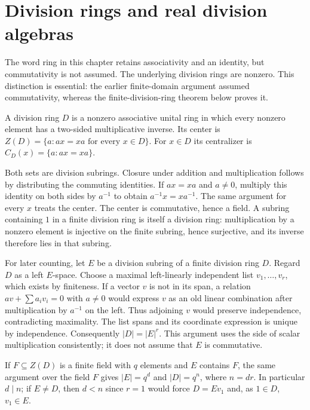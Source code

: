 \chapter{Division rings and real division algebras}
\label{chap:M07.23}
The word ring in this chapter retains associativity and an identity, but
commutativity is not assumed. The underlying division rings are nonzero.
This distinction is essential: the earlier finite-domain argument assumed
commutativity, whereas the finite-division-ring theorem below proves it.

\begin{definition}
A division ring $D$ is a nonzero associative unital ring in which every
nonzero element has a two-sided multiplicative inverse. Its center is
$Z(D)=\{a:ax=xa\text{ for every }x\in D\}$. For $x\in D$ its
centralizer is $C_D(x)=\{a:ax=xa\}$.
\end{definition}
Both sets are division subrings. Closure under addition and multiplication
follows by distributing the commuting identities. If $ax=xa$ and $a\ne0$,
multiply this identity on both sides by $a^{-1}$ to obtain
$a^{-1}x=xa^{-1}$. The same argument for every $x$ treats the center.
The center is commutative, hence a field. A subring containing $1$ in a
finite division ring is itself a division ring: multiplication by a
nonzero element is injective on the finite subring, hence surjective, and
its inverse therefore lies in that subring.

For later counting, let $E$ be a division subring of a finite division
ring $D$. Regard $D$ as a left $E$-space. Choose a maximal left-linearly
independent list $v_1,\ldots,v_r$, which exists by finiteness. If a vector
$v$ is not in its span, a relation
$a v+\sum a_i v_i=0$ with $a\ne0$ would express $v$ as an old linear
combination after multiplication by $a^{-1}$ on the left. Thus adjoining
$v$ would preserve independence, contradicting maximality. The list
spans and its coordinate expression is unique by independence. Consequently
$|D|=|E|^r$. This argument uses the side of scalar multiplication consistently;
it does not assume that $E$ is commutative.

If $F\subseteq Z(D)$ is a finite field with $q$ elements and $E$ contains
$F$, the same argument over the field $F$ gives $|E|=q^d$ and
$|D|=q^n$, where $n=dr$. In particular $d\mid n$; if $E\ne D$, then
$d<n$ since $r=1$ would force $D=Ev_1$ and, as $1\in D$, $v_1\in E$.

